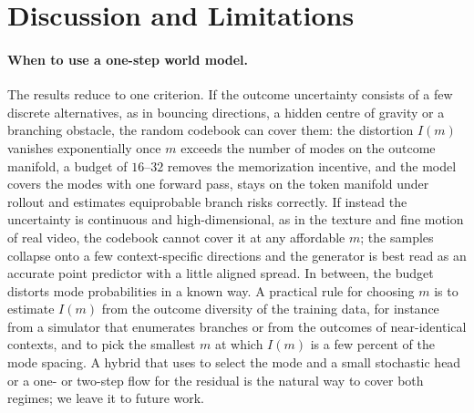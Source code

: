 \section{Discussion and Limitations}
\label{sec:discussion}

\paragraph{When to use a one-step \nom{} world model.}
The results reduce to one criterion. If the outcome uncertainty consists of a few discrete alternatives, as in bouncing directions, a hidden centre of gravity or a branching obstacle, the random codebook can cover them: the distortion $I(m)$ vanishes exponentially once $m$ exceeds the number of modes on the outcome manifold, a budget of $16$--$32$ removes the memorization incentive, and the model covers the modes with one forward pass, stays on the token manifold under rollout and estimates equiprobable branch risks correctly. If instead the uncertainty is continuous and high-dimensional, as in the texture and fine motion of real video, the codebook cannot cover it at any affordable $m$; the samples collapse onto a few context-specific directions and the generator is best read as an accurate point predictor with a little aligned spread. In between, the budget distorts mode probabilities in a known way. A practical rule for choosing $m$ is to estimate $I(m)$ from the outcome diversity of the training data, for instance from a simulator that enumerates branches or from the outcomes of near-identical contexts, and to pick the smallest $m$ at which $I(m)$ is a few percent of the mode spacing. A hybrid that uses \nom{} to select the mode and a small stochastic head or a one- or two-step flow for the residual is the natural way to cover both regimes; we leave it to future work.

